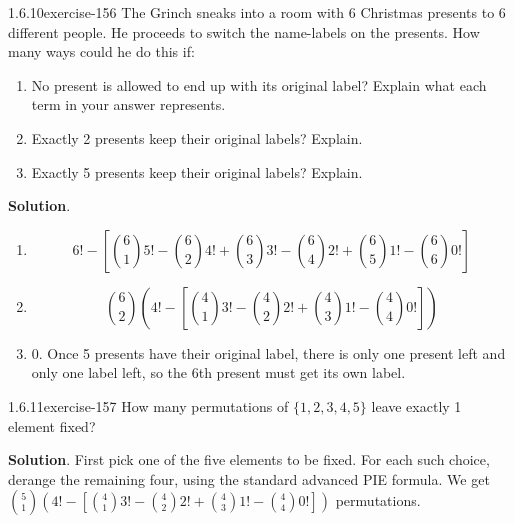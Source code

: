 \documentclass[twoside,11pt,]{book}
\numberwithin{equation}{chapter}
\begin{document}
\begin{divisionsolution}{1.6.10}{}{exercise-156}%
\hypertarget{p-2572}{}%
The Grinch sneaks into a room with 6 Christmas presents to 6 different people. He proceeds to switch the name-labels on the presents. How many ways could he do this if:\leavevmode%
\begin{enumerate}[label=(\alph*)]
\item\hypertarget{li-1520}{}\hypertarget{p-2573}{}%
No present is allowed to end up with its original label? Explain what each term in your answer represents.%
\item\hypertarget{li-1521}{}\hypertarget{p-2574}{}%
Exactly 2 presents keep their original labels? Explain.%
\item\hypertarget{li-1522}{}\hypertarget{p-2575}{}%
Exactly 5 presents keep their original labels? Explain.%
\end{enumerate}
%
\par\smallskip%
\noindent\textbf{Solution}.\quad%
\hypertarget{p-2576}{}%
\leavevmode%
\begin{enumerate}[label=(\alph*)]
\item\hypertarget{li-1523}{}\hypertarget{p-2577}{}%
%
\begin{equation*}
6! - \left[{6 \choose 1}5! - {6 \choose 2}4! + {6 \choose 3}3! - {6 \choose 4}2! + {6 \choose 5}1! - {6 \choose 6}0!\right]
\end{equation*}
%
\item\hypertarget{li-1524}{}\hypertarget{p-2578}{}%
%
\begin{equation*}
{6 \choose 2}\left(4! - \left[{4\choose 1}3! - {4 \choose 2}2! + {4 \choose 3}1! - {4 \choose 4}0!\right]\right)
\end{equation*}
%
\item\hypertarget{li-1525}{}\hypertarget{p-2579}{}%
0. Once 5 presents have their original label, there is only one present left and only one label left, so the 6th present must get its own label.%
\end{enumerate}
%
\end{divisionsolution}%
\begin{divisionsolution}{1.6.11}{}{exercise-157}%
\hypertarget{p-2583}{}%
How many permutations of \(\{1,2,3,4,5\}\) leave exactly 1 element fixed?%
\par\smallskip%
\noindent\textbf{Solution}.\quad%
\hypertarget{p-2585}{}%
First pick one of the five elements to be fixed. For each such choice, derange the remaining four, using the standard advanced PIE formula. We get \({5 \choose 1}\left( 4! - \left[{4 \choose 1}3! - {4 \choose 2}2! + {4 \choose 3} 1! - {4 \choose 4} 0!\right] \right)\) permutations.%
\end{divisionsolution}%
\end{document}

